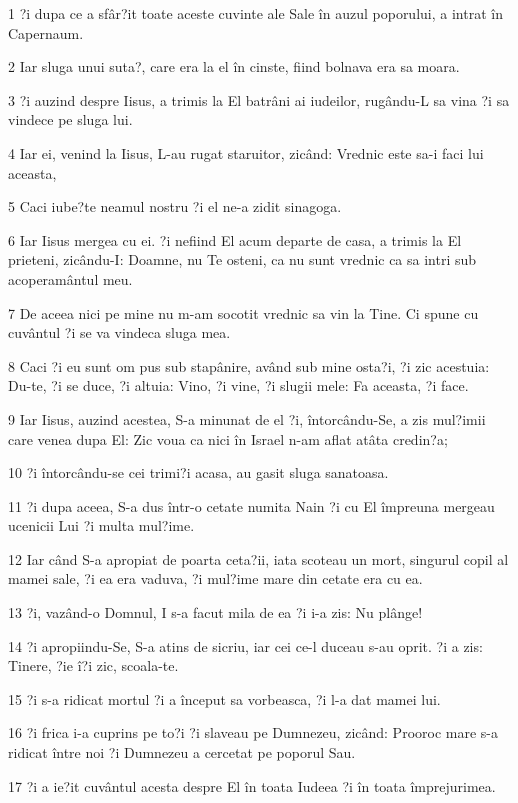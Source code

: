 \par 1 ?i dupa ce a sfâr?it toate aceste cuvinte ale Sale în auzul poporului, a intrat în Capernaum.
\par 2 Iar sluga unui suta?, care era la el în cinste, fiind bolnava era sa moara.
\par 3 ?i auzind despre Iisus, a trimis la El batrâni ai iudeilor, rugându-L sa vina ?i sa vindece pe sluga lui.
\par 4 Iar ei, venind la Iisus, L-au rugat staruitor, zicând: Vrednic este sa-i faci lui aceasta,
\par 5 Caci iube?te neamul nostru ?i el ne-a zidit sinagoga.
\par 6 Iar Iisus mergea cu ei. ?i nefiind El acum departe de casa, a trimis la El prieteni, zicându-I: Doamne, nu Te osteni, ca nu sunt vrednic ca sa intri sub acoperamântul meu.
\par 7 De aceea nici pe mine nu m-am socotit vrednic sa vin la Tine. Ci spune cu cuvântul ?i se va vindeca sluga mea.
\par 8 Caci ?i eu sunt om pus sub stapânire, având sub mine osta?i, ?i zic acestuia: Du-te, ?i se duce, ?i altuia: Vino, ?i vine, ?i slugii mele: Fa aceasta, ?i face.
\par 9 Iar Iisus, auzind acestea, S-a minunat de el ?i, întorcându-Se, a zis mul?imii care venea dupa El: Zic voua ca nici în Israel n-am aflat atâta credin?a;
\par 10 ?i întorcându-se cei trimi?i acasa, au gasit sluga sanatoasa.
\par 11 ?i dupa aceea, S-a dus într-o cetate numita Nain ?i cu El împreuna mergeau ucenicii Lui ?i multa mul?ime.
\par 12 Iar când S-a apropiat de poarta ceta?ii, iata scoteau un mort, singurul copil al mamei sale, ?i ea era vaduva, ?i mul?ime mare din cetate era cu ea.
\par 13 ?i, vazând-o Domnul, I s-a facut mila de ea ?i i-a zis: Nu plânge!
\par 14 ?i apropiindu-Se, S-a atins de sicriu, iar cei ce-l duceau s-au oprit. ?i a zis: Tinere, ?ie î?i zic, scoala-te.
\par 15 ?i s-a ridicat mortul ?i a început sa vorbeasca, ?i l-a dat mamei lui.
\par 16 ?i frica i-a cuprins pe to?i ?i slaveau pe Dumnezeu, zicând: Prooroc mare s-a ridicat între noi ?i Dumnezeu a cercetat pe poporul Sau.
\par 17 ?i a ie?it cuvântul acesta despre El în toata Iudeea ?i în toata împrejurimea.
